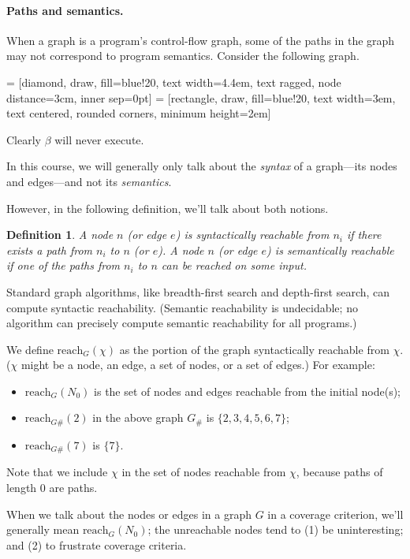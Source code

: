 \documentclass[11pt]{article}
\newtheorem{defn}{Definition}
\begin{document}
\paragraph{Paths and semantics.} When a graph is a program's control-flow
graph, some of the paths in the graph may not correspond to program
semantics. Consider the following graph.

 = [diamond, draw, fill=blue!20, 
    text width=4.4em, text ragged, node distance=3cm, inner sep=0pt]
 = [rectangle, draw, fill=blue!20, 
    text width=3em, text centered, rounded corners, minimum height=2em]

\begin{center}
\end{center}
Clearly $\beta$ will never execute. 

In this course, we will generally only talk about the \emph{syntax} of a graph---its nodes
and edges---and not its \emph{semantics}.

However, in the following definition, we'll talk about both notions.
\begin{defn}
A node $n$ (or edge $e$) is \emph{syntactically reachable} from $n_i$
if there exists a path from $n_i$ to $n$ (or $e$). A node $n$ (or edge $e$)
is \emph{semantically reachable} if one of the paths from $n_i$ to $n$
can be reached on some input.
\end{defn}

Standard graph algorithms, like breadth-first search and depth-first
search, can compute syntactic reachability. (Semantic reachability is
undecidable; no algorithm can precisely compute semantic reachability
for all programs.)

We define $\mbox{reach}_G(\chi)$ as the portion of the graph syntactically reachable
from $\chi$. ($\chi$ might be a node, an edge, a set of nodes, or a set
of edges.) For example:
\begin{itemize}
\item $\mbox{reach}_G(N_0)$ is the set of nodes and edges reachable from
the initial node(s);
\item $\mbox{reach}_{G\#}(2)$ in the above graph $G_\#$ is $\{2, 3, 4, 5, 6, 7\}$;
\item $\mbox{reach}_{G\#}(7)$ is $\{7\}$.
\end{itemize}
Note that we include $\chi$ in the set of nodes reachable from $\chi$, because
paths of length 0 are paths.

When we talk about the nodes or edges in a graph $G$ in a coverage
criterion, we'll generally mean $\mbox{reach}_G(N_0)$; the unreachable nodes
tend to (1) be uninteresting; and (2) to frustrate coverage criteria.
\end{document}
